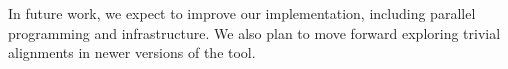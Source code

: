 \documentclass{llncs}
\begin{document}
In future work, we expect to improve our implementation, including parallel programming and infrastructure. We also plan to move forward exploring trivial alignments in newer versions of the tool. 



\end{document}
